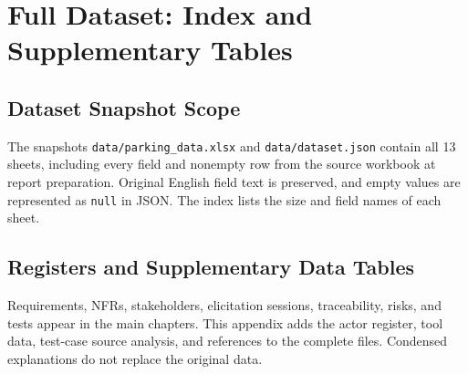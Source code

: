 \chapter[Appendix: Full Dataset]{Full Dataset: Index and Supplementary Tables}
\section{Dataset Snapshot Scope}
The snapshots \texttt{data/parking\_data.xlsx} and \texttt{data/dataset.json} contain all 13 sheets, including every field and nonempty row from the source workbook at report preparation. Original English field text is preserved, and empty values are represented as \texttt{null} in JSON. The index lists the size and field names of each sheet.

\section{Registers and Supplementary Data Tables}
Requirements, NFRs, stakeholders, elicitation sessions, traceability, risks, and tests appear in the main chapters. This appendix adds the actor register, tool data, test-case source analysis, and references to the complete files. Condensed explanations do not replace the original data.

